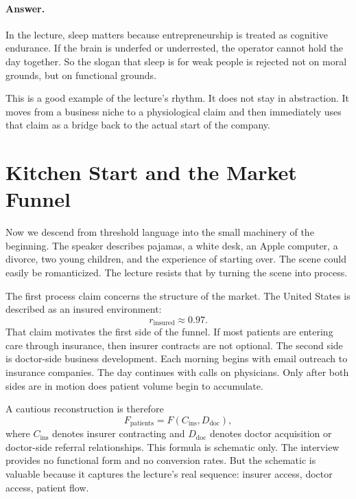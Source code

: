 \paragraph{Answer.} In the lecture, sleep matters because entrepreneurship is treated as cognitive endurance. If the brain is underfed or underrested, the operator cannot hold the day together. So the slogan that sleep is for weak people is rejected not on moral grounds, but on functional grounds.

This is a good example of the lecture’s rhythm. It does not stay in abstraction. It moves from a business niche to a physiological claim and then immediately uses that claim as a bridge back to the actual start of the company.

\section{Kitchen Start and the Market Funnel}

Now we descend from threshold language into the small machinery of the beginning. The speaker describes pajamas, a white desk, an Apple computer, a divorce, two young children, and the experience of starting over. The scene could easily be romanticized. The lecture resists that by turning the scene into process.

The first process claim concerns the structure of the market. The United States is described as an insured environment:
\begin{equation}
r_{\text{insured}} \approx 0.97.
\end{equation}
That claim motivates the first side of the funnel. If most patients are entering care through insurance, then insurer contracts are not optional. The second side is doctor-side business development. Each morning begins with email outreach to insurance companies. The day continues with calls on physicians. Only after both sides are in motion does patient volume begin to accumulate.

A cautious reconstruction is therefore
\begin{equation}
F_{\text{patients}} = F(C_{\text{ins}},D_{\text{doc}}),
\end{equation}
where \(C_{\text{ins}}\) denotes insurer contracting and \(D_{\text{doc}}\) denotes doctor acquisition or doctor-side referral relationships. This formula is schematic only. The interview provides no functional form and no conversion rates. But the schematic is valuable because it captures the lecture’s real sequence: insurer access, doctor access, patient flow.

